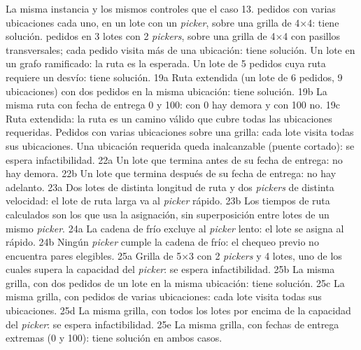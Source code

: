 	\bTR {} \eTD \bTD La misma instancia y los mismos controles que el caso 13. \eTD \eTR
	\bTR {} \eTD {} pedidos con varias ubicaciones cada uno, en un lote con un {\em picker}, sobre una grilla de 4×4: tiene solución. \eTD \eTR
	\bTR {} \eTD {} pedidos en 3 lotes con 2 {\em pickers}, sobre una grilla de 4×4 con pasillos transversales; cada pedido visita más de una ubicación: tiene solución. \eTD \eTR
	\bTR {} \eTD \bTD Un lote en un grafo ramificado: la ruta es la esperada. \eTD \eTR
	\bTR {} \eTD \bTD Un lote de 5 pedidos cuya ruta requiere un desvío: tiene solución. \eTD \eTR
	\bTR \bTD 19a \eTD \bTD Ruta extendida (un lote de 6 pedidos, 9 ubicaciones) con dos pedidos en la misma ubicación: tiene solución. \eTD \eTR
	\bTR \bTD 19b \eTD \bTD La misma ruta con fecha de entrega 0 y 100: con 0 hay demora y con 100 no. \eTD \eTR
	\bTR \bTD 19c \eTD \bTD Ruta extendida: la ruta es un camino válido que cubre todas las ubicaciones requeridas. \eTD \eTR
	\bTR {} \eTD \bTD Pedidos con varias ubicaciones sobre una grilla: cada lote visita todas sus ubicaciones. \eTD \eTR
	\bTR {} \eTD \bTD Una ubicación requerida queda inalcanzable (puente cortado): se espera infactibilidad. \eTD \eTR
	\bTR \bTD 22a \eTD \bTD Un lote que termina antes de su fecha de entrega: no hay demora. \eTD \eTR
	\bTR \bTD 22b \eTD \bTD Un lote que termina después de su fecha de entrega: no hay adelanto. \eTD \eTR
	\bTR \bTD 23a \eTD \bTD Dos lotes de distinta longitud de ruta y dos {\em pickers} de distinta velocidad: el lote de ruta larga va al {\em picker} rápido. \eTD \eTR
	\bTR \bTD 23b \eTD \bTD Los tiempos de ruta calculados son los que usa la asignación, sin superposición entre lotes de un mismo {\em picker}. \eTD \eTR
	\bTR \bTD 24a \eTD \bTD La cadena de frío excluye al {\em picker} lento: el lote se asigna al rápido. \eTD \eTR
	\bTR \bTD 24b \eTD \bTD Ningún {\em picker} cumple la cadena de frío: el chequeo previo no encuentra pares elegibles. \eTD \eTR
	\bTR \bTD 25a \eTD \bTD Grilla de 5×3 con 2 {\em pickers} y 4 lotes, uno de los cuales supera la capacidad del {\em picker}: se espera infactibilidad. \eTD \eTR
	\bTR \bTD 25b \eTD \bTD La misma grilla, con dos pedidos de un lote en la misma ubicación: tiene solución. \eTD \eTR
	\bTR \bTD 25c \eTD \bTD La misma grilla, con pedidos de varias ubicaciones: cada lote visita todas sus ubicaciones. \eTD \eTR
	\bTR \bTD 25d \eTD \bTD La misma grilla, con todos los lotes por encima de la capacidad del {\em picker}: se espera infactibilidad. \eTD \eTR
	\bTR \bTD 25e \eTD \bTD La misma grilla, con fechas de entrega extremas (0 y 100): tiene solución en ambos casos. \eTD \eTR
